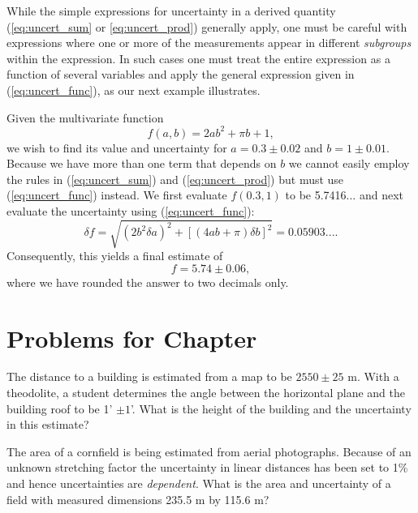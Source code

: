 While the simple expressions for uncertainty in a derived quantity (\ref{eq:uncert_sum} or \ref{eq:uncert_prod}) generally apply, one must
be careful with expressions where one or more of the measurements appear in different \emph{subgroups} within the
expression.  In such cases one must treat the entire expression as a function of several variables and apply the
general expression given in (\ref{eq:uncert_func}), as our next example illustrates.
\begin{example}
Given the multivariate function
\begin{equation}
	f(a,b) = 2ab^2 + \pi b + 1,
\end{equation}
we wish to find its value and uncertainty for $a = 0.3 \pm 0.02$ and $b = 1 \pm 0.01$.
Because we have more than one term that depends on $b$ we cannot easily employ the rules
in (\ref{eq:uncert_sum}) and (\ref{eq:uncert_prod}) but must use (\ref{eq:uncert_func}) instead.
We first evaluate $f(0.3,1)$ to be 5.7416... and
next evaluate the uncertainty using (\ref{eq:uncert_func}):
\begin{equation}
	\delta f = \sqrt{\left (2b^2 \delta a \right)^2 + \left [ (4ab + \pi)\delta b \right ]^2} = 0.05903....
\end{equation}
Consequently, this yields a final estimate of
\begin{equation}
	f = 5.74 \pm 0.06,
\end{equation}
where we have rounded the answer to two decimals only.
\end{example}

\clearpage
\section{Problems for Chapter \thechapter}

\begin{problem}
	The distance to a building is estimated from a map to be $2550\pm25$ m.  With a theodolite,
a student determines the angle between the horizontal plane and the building roof to be 1' $\pm 1$'.
What is the height of the building and the uncertainty in this estimate?
\end{problem}

\begin{problem}
	The area of a cornfield is being estimated from aerial photographs.  Because of an unknown stretching factor
	the uncertainty in linear distances has been set to 1\% and hence uncertainties are \emph{dependent}.  What is the
	area and uncertainty of a field with measured dimensions 235.5 m by 115.6 m?
\end{problem}

